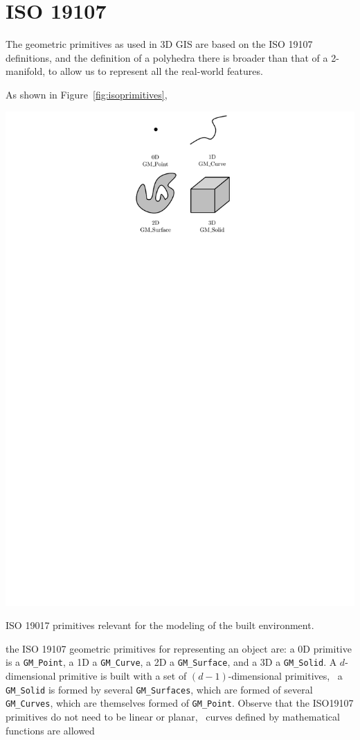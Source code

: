 %
\section{ISO 19107}

The geometric primitives as used in 3D GIS are based on the ISO 19107 definitions, and the definition of a polyhedra there is broader than that of a 2-manifold, to allow us to represent all the real-world features.

As shown in Figure~\ref{fig:isoprimitives}, 
\begin{marginfigure}
  \centering
  \includegraphics[width=\linewidth]{figs/isoprimitives.pdf}
  \caption{ISO 19017 primitives relevant for the modeling of the built environment.}%
\label{fig:isoprimitives}
\end{marginfigure}
the ISO 19107 geometric primitives for representing an object are: a 0D primitive is a \texttt{GM\_Point}, a 1D a \texttt{GM\_Curve}, a 2D a \texttt{GM\_Surface}, and a 3D a \texttt{GM\_Solid}.
A $d$-dimensional primitive is built with a set of $(d-1)$-dimensional primitives, \eg\ a \texttt{GM\_Solid} is formed by several \texttt{GM\_Surfaces}, which are formed of several \texttt{GM\_Curves}, which are themselves formed of \texttt{GM\_Point}.
Observe that the ISO19107 primitives do not need to be linear or planar, \ie\ curves defined by mathematical functions are allowed

